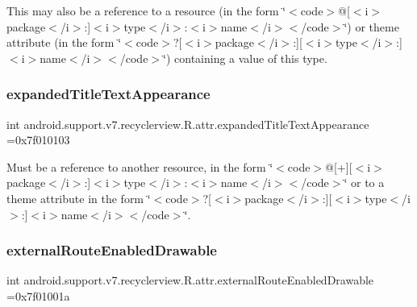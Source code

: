 This may also be a reference to a resource (in the form \char`\"{}$<$code$>$@\mbox{[}$<$i$>$package$<$/i$>$\+:\mbox{]}$<$i$>$type$<$/i$>$\+:$<$i$>$name$<$/i$>$$<$/code$>$\char`\"{}) or theme attribute (in the form \char`\"{}$<$code$>$?\mbox{[}$<$i$>$package$<$/i$>$\+:\mbox{]}\mbox{[}$<$i$>$type$<$/i$>$\+:\mbox{]}$<$i$>$name$<$/i$>$$<$/code$>$\char`\"{}) containing a value of this type. \mbox{\label{classandroid_1_1support_1_1v7_1_1recyclerview_1_1R_1_1attr_a663bc8cc1d8c534468ed1cadd0368dbd}} 
\subsubsection{\texorpdfstring{expanded\+Title\+Text\+Appearance}{expandedTitleTextAppearance}}
{\footnotesize\ttfamily int android.\+support.\+v7.\+recyclerview.\+R.\+attr.\+expanded\+Title\+Text\+Appearance =0x7f010103\hspace{0.3cm}{\ttfamily [static]}}

Must be a reference to another resource, in the form \char`\"{}$<$code$>$@\mbox{[}+\mbox{]}\mbox{[}$<$i$>$package$<$/i$>$\+:\mbox{]}$<$i$>$type$<$/i$>$\+:$<$i$>$name$<$/i$>$$<$/code$>$\char`\"{} or to a theme attribute in the form \char`\"{}$<$code$>$?\mbox{[}$<$i$>$package$<$/i$>$\+:\mbox{]}\mbox{[}$<$i$>$type$<$/i$>$\+:\mbox{]}$<$i$>$name$<$/i$>$$<$/code$>$\char`\"{}. \mbox{\label{classandroid_1_1support_1_1v7_1_1recyclerview_1_1R_1_1attr_a71ea680382f041b36a4f9c2c8e3fdcc6}} 
\subsubsection{\texorpdfstring{external\+Route\+Enabled\+Drawable}{externalRouteEnabledDrawable}}
{\footnotesize\ttfamily int android.\+support.\+v7.\+recyclerview.\+R.\+attr.\+external\+Route\+Enabled\+Drawable =0x7f01001a\hspace{0.3cm}{\ttfamily [static]}}

